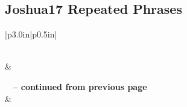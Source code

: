 \subsection{Joshua17 Repeated Phrases}


\normalsize
 
\begin{center}
\begin{longtable}{|p{3.0in}|p{0.5in}|}
\caption[Joshua17 Repeated Phrases]{Joshua17 Repeated Phrases}\label{table:Repeated Phrases Joshua17} \\
\hline {} &  \\ \hline 
\endfirsthead
 
{{\bfseries \tablename\ \thetable{} -- continued from previous page}} \\  
\hline {} &  \\ \hline 
\endhead
 

\end{longtable}
\end{center}

